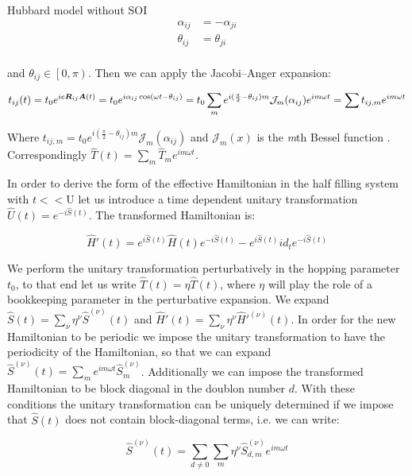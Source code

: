 \begin{section}{Hubbard model without SOI}
\begin{align}
\alpha_{ij} &= -\alpha_{ji} \label{alphaSym} \\
\theta_{ij} &= \theta_{ji} \label{thetaSym} \\
\end{align}

and $\theta_{ij} \in \left[0,\pi\right)$. Then we can apply the Jacobi–Anger expansion:

\begin{align*}
t_{ij}(t) = t_0e^{ie\boldsymbol{R}_{ij}\boldsymbol{A}(t)} = t_0e^{i\alpha_{ij} \cos(\omega t - \theta_{ij})} = t_0 \sum_m e^{i(\frac{\pi}{2}-\theta_{ij})m} \mathcal{J}_m(\alpha_{ij}) e^{im\omega t} = \sum t_{ij,m} e^{im\omega t}
\end{align*}

Where $t_{ij,m} = t_0 e^{i(\frac{\pi}{2}-\theta_{ij})m} \mathcal{J}_m(\alpha_{ij})$ and $\mathcal{J}_m(x)$ is the \textit{m}th Bessel function \cite{Kitamura2017}. Correspondingly $\hat{T}(t) = \sum_m \hat{T}_m e^{im \omega t}$.

In order to derive the form of the effective Hamiltonian in the half filling system with $t << \text{U}$ let us introduce a time dependent unitary transformation $\hat{U}(t) = e^{-i\hat{S}(t)}$. The transformed Hamiltonian is:

\begin{equation}
\hat{H}'(t) = e^{i\hat{S}(t)} \hat{H}(t) e^{-i\hat{S}(t)} - e^{i\hat{S}(t)} id_t e^{-i\hat{S}(t)}
\end{equation} 

We perform the unitary transformation perturbatively in the hopping parameter $t_0$, to that end let us write $\hat{T}(t) = \eta \hat{T}(t)$, where $\eta$ will play the role of a bookkeeping parameter in the perturbative expansion. We expand $\hat{S}(t) = \sum_\nu \eta^\nu \hat{S}^{(\nu)}(t)$ and $\hat{H}'(t) = \sum_\nu \eta^\nu \hat{H}'^{(\nu)}(t)$. In order for the new Hamiltonian to be periodic we impose the unitary transformation to have the periodicity of the Hamiltonian, so that we can expand $\hat{S}^{(\nu)}(t) = \sum_m e^{im\omega t}\hat{S}^{(\nu)}_m$. Additionally we can impose the transformed Hamiltonian to be block diagonal in the doublon number $d$. With these conditions the unitary transformation can be uniquely determined if we impose that $\hat{S}(t)$ does not contain block-diagonal terms, i.e. we can write:

\begin{equation}
\hat{S}^{(\nu)}(t) = \sum_{d \neq 0} \sum_m \eta^\nu \hat{S}^{(\nu)}_{d,m} e^{im\omega t}
\end{equation}


\end{section}
